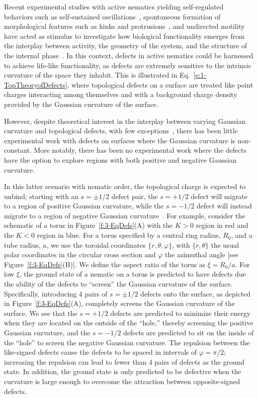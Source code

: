 Recent experimental studies with active nematics yielding self-regulated behaviors such as self-sustained oscillations~\cite{RN9}, spontaneous formation of morphological features such as kinks and protrusions~\cite{RN9,RN3}, and undirected motility~\cite{RN9,RN3} have acted as stimulus to investigate how biological functionality emerges from the interplay between activity, the geometry of the system, and the structure of the internal phase~\cite{RN160,RN51,RN10}.
In this context, defects in active nematics could be harnessed to achieve life-like functionality, as defects are extremely sensitive to the intrinsic curvature of the space they inhabit.
This is illustrated in Eq.~\ref{e:1-TopTheoryofDefects}, where topological defects on a surface are treated like point charges interacting among themselves and with a background charge density provided by the Gaussian curvature of the surface.

However, despite theoretical interest in the interplay between varying Gaussian curvature and topological defects, with few exceptions~\cite{RN84,RN25,RN73,RN81}, there has been little experimental work with defects on surfaces where the Gaussian curvature is non-constant.
More notably, there has been no experimental work where the defects have the option to explore regions with both positive and negative Gaussian curvature.

In this latter scenario with nematic order, the topological charge is expected to unbind; starting with an $s = \pm 1/2$ defect pair, the $s = +1/2$ defect will migrate to a region of positive Gaussian curvature, while the $s=  -1/2$ defect will instead migrate to a region of negative Gaussian curvature~\cite{RN17,RN19,RN22}.
For example, consider the schematic of a torus in Figure~\ref{f:3-EqDefs}(A) with the $K>0$ region in red and the $K<0$ region in blue.
For a torus specified by a central ring radius, $R_0$, and a tube radius, $a$, we use the toroidal coordinates $\{r,\theta,\varphi\}$, with $\{r,\theta \}$ the usual polar coordinates in the circular cross section and $\varphi$ the azimuthal angle [see Figure~\ref{f:3-EqDefs}(B)].
We define the aspect ratio of the torus as $\xi = R_0/a$.
For low $\xi$, the ground state of a nematic on a torus is predicted to have defects due the ability of the defects to ``screen'' the Gaussian curvature of the surface.
Specifically, introducing 4 pairs of $s = \pm 1/2$ defects onto the surface, as depicted in Figure~\ref{f:3-EqDefs}(A), completely screens the Gaussian curvature of the surface.
We see that the $s = +1/2$ defects are predicted to minimize their energy when they are located on the outside of the ``hole,'' thereby screening the positive Gaussian curvature, and the $s = -1/2$ defects are predicted to sit on the inside of the ``hole'' to screen the negative Gaussian curvature.
The repulsion between the like-signed defects cause the defects to be spaced in intervals of $\varphi = \pi/2$; increasing the repulsion can lead to fewer than 4 pairs of defects as the ground state.
In addition, the ground state is only predicted to be defective when the curvature is large enough to overcome the attraction between opposite-signed defects.

